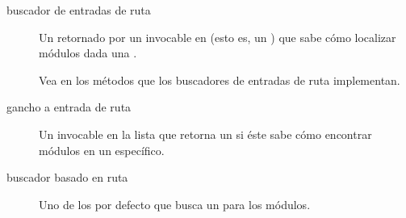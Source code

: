 \documentclass[a4,10pt,spanish]{sphinxmanual}
\begin{document}
\begin{description}
\item[{buscador de entradas de ruta\label{\detokenize{glossary:term-path-entry-finder}}}] \leavevmode
\sphinxAtStartPar
Un {\hyperref[\detokenize{glossary:term-finder}]{}} retornado por un invocable en  (esto es, un {\hyperref[\detokenize{glossary:term-path-entry-hook}]{}}) que sabe cómo localizar módulos dada una {\hyperref[\detokenize{glossary:term-path-entry}]{}}.

\sphinxAtStartPar
Vea en  los métodos que los buscadores de entradas de ruta implementan.

\item[{gancho a entrada de ruta\label{\detokenize{glossary:term-path-entry-hook}}}] \leavevmode
\sphinxAtStartPar
Un invocable en la lista  que retorna un {\hyperref[\detokenize{glossary:term-path-entry-finder}]{}} si éste sabe cómo encontrar módulos en un {\hyperref[\detokenize{glossary:term-path-entry}]{}} específico.

\item[{buscador basado en ruta\label{\detokenize{glossary:term-path-based-finder}}}] \leavevmode
\sphinxAtStartPar
Uno de los {\hyperref[\detokenize{glossary:term-meta-path-finder}]{}} por defecto que busca un {\hyperref[\detokenize{glossary:term-import-path}]{}} para los módulos.


\end{description}
\end{document}

